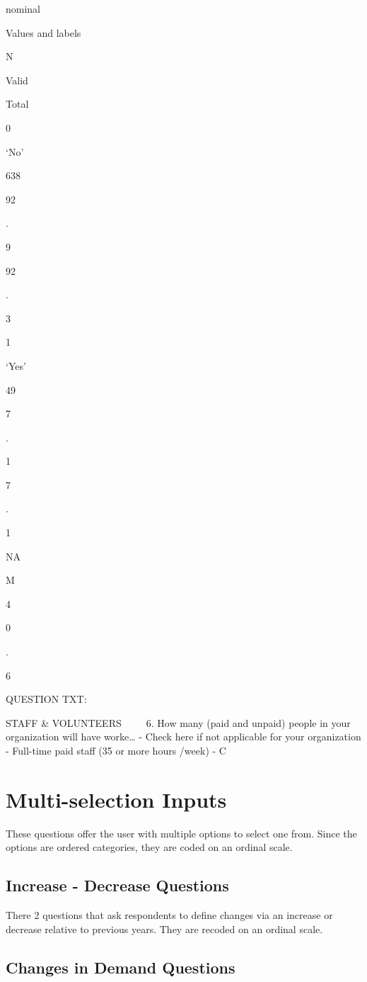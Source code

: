 \documentclass[
  letterpaper,
]{scrbook}
\begin{document}
nominal

Values and labels

N

Valid

Total

0

`No'

638

92

.

9

92

.

3

1

`Yes'

49

7

.

1

7

.

1

NA

M

4

0

.

6

QUESTION TXT:

STAFF \& VOLUNTEERS ~~ ~ 6. How many (paid and unpaid) people in your
organization will have worke\ldots{} - Check here if not applicable for
your organization - Full-time paid staff (35 or more hours /week) - C

\chapter{Multi-selection Inputs}\label{multi-selection-inputs}

These questions offer the user with multiple options to select one from.
Since the options are ordered categories, they are coded on an ordinal
scale.

\section{Increase - Decrease
Questions}\label{increase---decrease-questions}

There 2 questions that ask respondents to define changes via an increase
or decrease relative to previous years. They are recoded on an ordinal
scale.

\section{Changes in Demand Questions}\label{changes-in-demand-questions}
\end{document}
